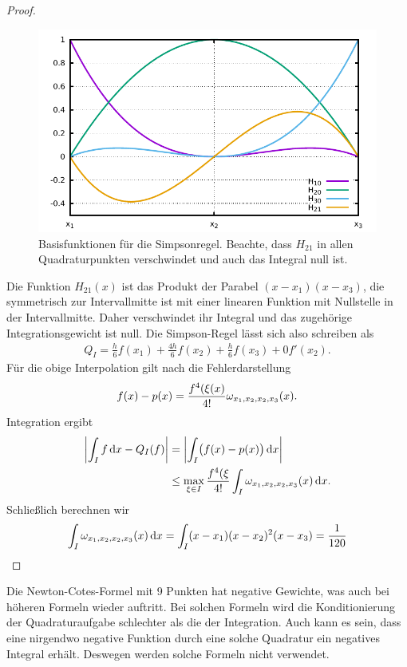 \begin{proof}
  \begin{figure}[tp]
    \centering
    \includegraphics[width=.8\textwidth]{graph/interpolation/simpson}
    \caption{Basisfunktionen für die Simpsonregel. Beachte, dass $H_21$ in allen Quadraturpunkten verschwindet und auch das Integral null ist.}
    \label{fig:simpson}
  \end{figure}
  Die Funktion $H_{21}(x)$ ist das Produkt der Parabel
  $(x-x_1)(x-x_3)$, die symmetrisch zur Intervallmitte ist mit einer
  linearen Funktion mit Nullstelle in der Intervallmitte. Daher
  verschwindet ihr Integral und das zugehörige Integrationsgewicht ist
  null. Die Simpson-Regel lässt sich also schreiben als
  \begin{gather}
    Q_I = \frac h6f(x_1)+\frac{4h}6f(x_2) + \frac h6f(x_3) + 0 f'(x_2).
  \end{gather}
  Für die obige Interpolation gilt nach
   die Fehlerdarstellung
  \begin{gather}
    f(x) - p(x) = \frac{f^{4}(\xi(x)}{4!} \omega_{x_1,x_2,x_2,x_3}(x).
  \end{gather}
  Integration ergibt
  \begin{align}
    \left|\int_I f\,\mathrm{d} x - Q_I(f)\right|
    &= \left|\int_I \bigl(f(x) - p(x)\bigr)\,\mathrm{d} x\right|\\
    &\le \max_{\xi\in I} \frac{f^{4}(\xi}{4!}
      \int_I \omega_{x_1,x_2,x_2,x_3}(x) \,\mathrm{d} x.
  \end{align}
  Schließlich berechnen wir
  \begin{gather}
    \int_I \omega_{x_1,x_2,x_2,x_3}(x) \,\mathrm{d} x
    = \int_I (x-x_1)(x-x_2)^2(x-x_3)
    = \frac1{120}
  \end{gather}
\end{proof}

\begin{remark}
  Die Newton-Cotes-Formel mit 9 Punkten hat negative Gewichte, was
  auch bei höheren Formeln wieder auftritt. Bei solchen Formeln wird
  die Konditionierung der Quadraturaufgabe schlechter als die der
  Integration. Auch kann es sein, dass eine nirgendwo negative
  Funktion durch eine solche Quadratur ein negatives Integral erhält.
  Deswegen werden solche Formeln nicht verwendet.
\end{remark}

